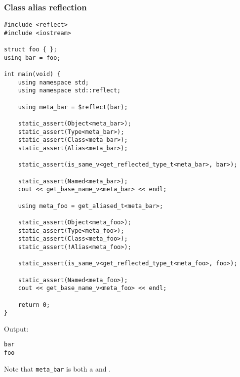 \subsubsection{Class alias reflection}

\begin{verbatim}
#include <reflect>
#include <iostream>

struct foo { };
using bar = foo;

int main(void) {
	using namespace std;
	using namespace std::reflect;

	using meta_bar = $reflect(bar);

	static_assert(Object<meta_bar>);
	static_assert(Type<meta_bar>);
	static_assert(Class<meta_bar>);
	static_assert(Alias<meta_bar>);

	static_assert(is_same_v<get_reflected_type_t<meta_bar>, bar>);

	static_assert(Named<meta_bar>);
	cout << get_base_name_v<meta_bar> << endl;

	using meta_foo = get_aliased_t<meta_bar>;

	static_assert(Object<meta_foo>);
	static_assert(Type<meta_foo>);
	static_assert(Class<meta_foo>);
	static_assert(!Alias<meta_foo>);

	static_assert(is_same_v<get_reflected_type_t<meta_foo>, foo>);

	static_assert(Named<meta_foo>);
	cout << get_base_name_v<meta_foo> << endl;

	return 0;
}
\end{verbatim}

Output:

\begin{verbatim}
bar
foo
\end{verbatim}

Note that \texttt{meta\_bar} is both a  and .

